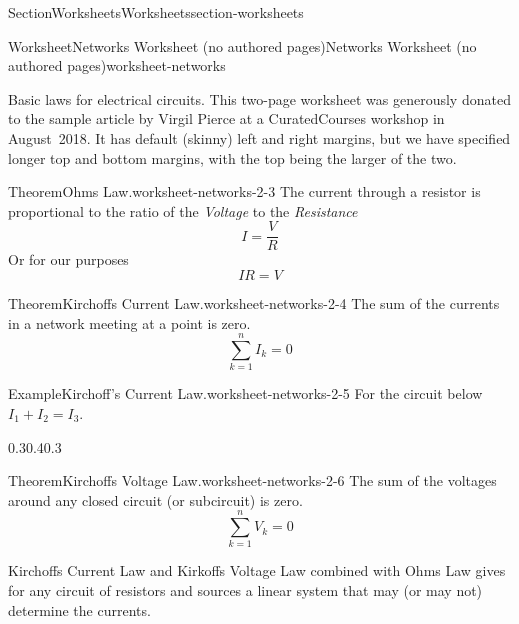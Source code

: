 \documentclass[oneside,10pt,]{article}
\numberwithin{equation}{section}
\begin{document}
\begin{sectionptx}{Section}{Worksheets}{}{Worksheets}{}{}{section-worksheets}
\begin{worksheet-subsection}{Worksheet}{Networks Worksheet (no authored pages)}{}{Networks Worksheet (no authored pages)}{}{}{worksheet-networks}
\begin{introduction}{Basic laws for electrical circuits.}%
This two-page worksheet was generously donated to the sample article by Virgil Pierce at a CuratedCourses workshop in August~2018.  It has default (skinny) left and right margins, but we have specified longer top and bottom margins, with the top being the larger of the two.%
\begin{theorem}{Theorem}{Ohms Law.}{}{worksheet-networks-2-3}%
The current through a resistor is proportional to the ratio of the \emph{Voltage} to the \emph{Resistance}%
\begin{equation*}
I = \frac{V}{R} 
\end{equation*}
Or for our purposes%
\begin{equation*}
I R = V 
\end{equation*}
%
\end{theorem}
\begin{theorem}{Theorem}{Kirchoffs Current Law.}{}{worksheet-networks-2-4}%
The sum of the currents in a network meeting at a point is zero.%
\begin{equation*}
\sum_{k=1}^n I_k = 0 
\end{equation*}
%
\end{theorem}
\begin{example}{Example}{Kirchoff's Current Law.}{worksheet-networks-2-5}%
For the circuit below \(I_1 + I_2 = I_3 \).%
\begin{image}{0.3}{0.4}{0.3}{}%
%
\end{image}%
\end{example}
\begin{theorem}{Theorem}{Kirchoffs Voltage Law.}{}{worksheet-networks-2-6}%
The sum of the voltages around any closed circuit (or subcircuit) is zero.%
\begin{equation*}
\sum_{k=1}^n V_k = 0 
\end{equation*}
%
\end{theorem}
Kirchoffs Current Law and Kirkoffs Voltage Law combined with Ohms Law gives for any circuit of resistors and sources a linear system that may (or may not) determine the currents.%

\end{introduction}
\end{worksheet-subsection}
\end{sectionptx}
\end{document}
